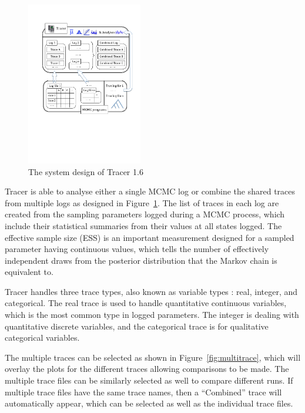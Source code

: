 \documentclass{bioinfo}
\begin{document}
\begin{figure}[ht]
\centerline{
\includegraphics[width=0.45\textwidth]{./figures/tracer.pdf}
}
\caption{The system design of Tracer 1.6}
\label{fig:tracer}
\end{figure}

Tracer is able to analyse either a single MCMC log or combine the shared traces from multiple logs as designed in Figure~\ref{fig:tracer}.
The list of traces in each log are created from the sampling parameters logged during a MCMC process, which include their statistical summaries from their values at all states logged.
The effective sample size (ESS) is an important measurement designed for a sampled parameter having continuous values, which tells the number of effectively independent draws from the posterior distribution that the Markov chain is equivalent to.

Tracer handles three trace types, also known as variable types \citep{mendenhall2012introduction}: real, integer, and categorical.
The real trace is used to handle quantitative continuous variables, which is the most common type in logged parameters.
The integer is dealing with quantitative discrete variables, and the categorical trace is for qualitative categorical variables.

The multiple traces can be selected as shown in Figure~\ref{fig:multitrace}, which will overlay the plots for the different traces allowing comparisons to be made. The multiple trace files can be similarly selected as well to compare different runs. If multiple trace files have the same trace names,  then a ``Combined'' trace will automatically appear, which can be selected as well as the individual trace files.
\end{document}
